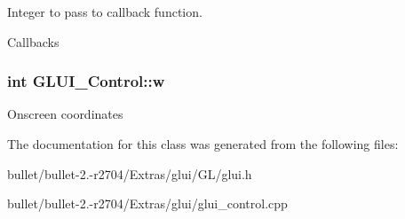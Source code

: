 Integer to pass to callback function. 

Callbacks \hypertarget{class_g_l_u_i___control_aca82a099b9cbbadb188794cbfb06aa27}{
\subsubsection[{w}]{\setlength{\rightskip}{0pt plus 5cm}int G\+L\+U\+I\+\_\+\+Control\+::w}}\label{class_g_l_u_i___control_aca82a099b9cbbadb188794cbfb06aa27}
Onscreen coordinates 

The documentation for this class was generated from the following files\+:\begin{DoxyCompactItemize}
\item 
bullet/bullet-\/2.-\/r2704/\+Extras/glui/\+G\+L/glui.\+h\item 
bullet/bullet-\/2.-\/r2704/\+Extras/glui/glui\+\_\+control.\+cpp\end{DoxyCompactItemize}
